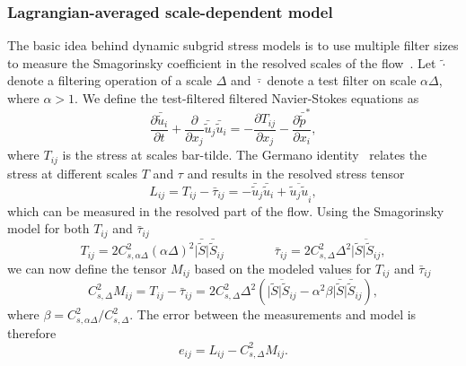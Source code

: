 \subsubsection{Lagrangian-averaged scale-dependent model}
\label{subsubsec:methods-les-subgrid-lasd}
The basic idea behind dynamic subgrid stress models is to use multiple filter sizes to measure the Smagorinsky coefficient in the resolved scales of the flow~\cite{Germano1992a, Bou-Zeid2005a}. Let $\tilde{\cdot}$ denote a filtering operation of a scale $\Delta$ and $\bar{\cdot}$ denote a test filter on scale $\alpha \Delta$, where $\alpha > 1$. We define the test-filtered filtered Navier-Stokes equations as
\begin{equation}
\frac{\partial \bar{\tilde{u}}_i}{\partial t} + \frac{\partial}{\partial x_j} \bar{\tilde{u}}_j\bar{\tilde{u}}_i  = - \frac{\partial T_{ij} }{\partial x_j} - \frac{\partial \bar{\tilde{p}}^*}{\partial x_i},
\end{equation}
where $T_{ij}$ is the stress at scales bar-tilde. The Germano identity~\cite{Germano1992a} relates the stress at different scales $T$ and $\tau$ and results in the resolved stress tensor
\begin{equation}
L_{ij} = T_{ij} - \bar{\tau}_{ij} = - \bar{\tilde{u}}_j\bar{\tilde{u}}_i + \overline{\tilde{u}_j\tilde{u}}_i,
\end{equation}
which can be measured in the resolved part of the flow. Using the Smagorinsky model for both $T_{ij}$ and $\bar{\tau}_{ij}$
\begin{equation}
T_{ij} = 2C_{s,\alpha\Delta}^2 \left( \alpha \Delta\right)^2 \vert \bar{\tilde{S}} \vert \bar{\tilde{S}}_{ij} \qquad \qquad \bar{\tau}_{ij} = 2C_{s,\Delta}^2 \Delta^2 \overline{\vert \tilde{S} \vert \tilde{S}_{ij}},
\end{equation}
we can now define the tensor $M_{ij}$ based on the modeled values for $T_{ij}$ and $\bar{\tau}_{ij}$
\begin{equation}
C_{s,\Delta}^2 M_{ij} = T_{ij} - \bar{\tau}_{ij} =2 C_{s,\Delta}^2 \Delta^2 \left( \overline{\vert \tilde{S} \vert \tilde{S}_{ij}} - \alpha^2 \beta \vert \bar{\tilde{S}} \vert \bar{\tilde{S}}_{ij} \right),
\end{equation}
where $\beta = C_{s,\alpha\Delta}^2 / C_{s,\Delta}^2$. The error between the measurements and model is therefore
\begin{equation}
e_{ij} = L_{ij} -  C_{s,\Delta}^2 M_{ij}.
\end{equation}

